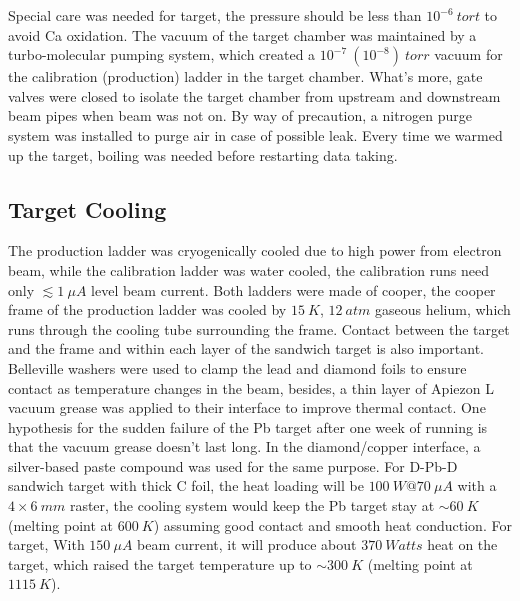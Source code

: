 Special care was needed for \Ca target, the pressure should be less than $10^{-6}\ tort$
to avoid Ca oxidation. The vacuum of the target chamber was maintained by a 
turbo-molecular pumping system, which created a $10^{-7}\ (10^{-8})\ torr$ vacuum 
for the calibration (production) ladder in the target chamber. What's more,
gate valves were closed to isolate the target chamber from upstream and downstream
beam pipes when beam was not on. By way of precaution, a nitrogen purge system 
was installed to purge air in case of possible leak.
Every time we warmed up the \Ca target, boiling was needed before restarting data taking.

\subsection{Target Cooling}
The production ladder was cryogenically cooled due to high power from electron beam,
while the calibration ladder was water cooled, the calibration runs need only
$\lesssim 1\ \mu A$ level beam current. Both ladders were made of cooper,
the cooper frame of the production ladder was cooled by $15\ K$, $12\ atm$ gaseous helium, 
which runs through the cooling tube surrounding the frame.
Contact between the target and the frame and within each layer of the \Pb sandwich
target is also important. Belleville washers were used to clamp the lead and 
diamond foils to ensure contact as temperature changes in the beam, besides, 
a thin layer of Apiezon L vacuum grease was applied to their interface to improve 
thermal contact. One hypothesis for the sudden failure of the Pb target after
one week of running is that the vacuum grease doesn't last long.
In the diamond/copper interface, a silver-based paste compound was used for the same purpose.
For D-Pb-D sandwich target with thick C foil, the heat loading will be $100\ W@70\ \mu A$
with a $4\times 6 \ mm$ raster, the cooling system would keep the Pb target stay at
$\sim60\ K$ (melting point at $600 \ K$) assuming good contact and smooth heat
conduction. For \Ca target, With $150\ \mu A$ beam current, 
it will produce about $370\ Watts$ heat on the target, which raised the target temperature 
up to $\sim300\ K$ (melting point at $1115\ K$).


